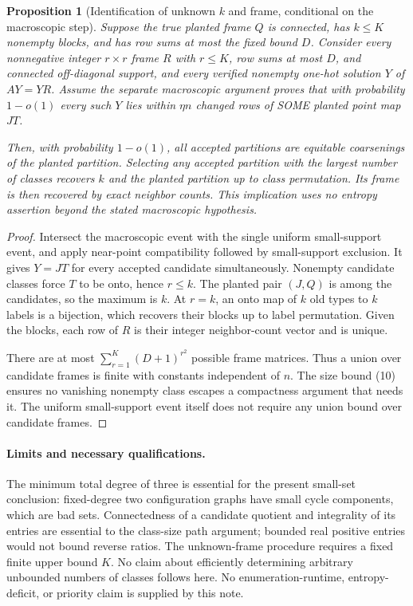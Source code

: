 \documentclass[11pt]{article}
\newtheorem{proposition}{Proposition}
\begin{document}
\begin{proposition}[Identification of unknown $k$ and frame, conditional
on the macroscopic step]
Suppose the true planted frame $Q$ is connected, has $k\leq K$ nonempty
blocks, and has row sums at most the fixed bound $D$. Consider every
nonnegative integer $r\times r$ frame $R$ with $r\leq K$, row sums at
most $D$, and connected off-diagonal support, and every verified nonempty
one-hot solution $Y$ of $AY=YR$. Assume the separate macroscopic argument
proves that with probability $1-o(1)$ every such $Y$ lies within
$\eta n$ changed rows of SOME planted point map $JT$.

Then, with probability $1-o(1)$, all accepted partitions are equitable
coarsenings of the planted partition. Selecting any accepted partition
with the largest number of classes recovers $k$ and the planted partition
up to class permutation. Its frame is then recovered by exact neighbor
counts. This implication uses no entropy assertion beyond the stated
macroscopic hypothesis.
\end{proposition}
\begin{proof}
Intersect the macroscopic event with the single uniform small-support
event, and apply near-point compatibility followed by small-support
exclusion. It gives $Y=JT$ for every accepted candidate simultaneously.
Nonempty candidate classes force $T$ to be onto, hence $r\leq k$.
The planted pair $(J,Q)$ is among the candidates, so the maximum is $k$.
At $r=k$, an onto map of $k$ old types to $k$ labels is a bijection,
which recovers their blocks up to label permutation. Given the blocks,
each row of $R$ is their integer neighbor-count vector and is unique.

There are at most $\sum_{r=1}^K(D+1)^{r^2}$ possible frame matrices.
Thus a union over candidate frames is finite with constants independent
of $n$. The size bound (10) ensures no vanishing nonempty class escapes
a compactness argument that needs it. The uniform small-support event
itself does not require any union bound over candidate frames.
\end{proof}

\paragraph{Limits and necessary qualifications.}
The minimum total degree of three is essential for the present small-set
conclusion: fixed-degree two configuration graphs have small cycle
components, which are bad sets. Connectedness of a candidate quotient
and integrality of its entries are essential to the class-size path
argument; bounded real positive entries would not bound reverse ratios.
The unknown-frame procedure requires a fixed finite upper bound $K$.
No claim about efficiently determining arbitrary unbounded numbers of
classes follows here. No enumeration-runtime, entropy-deficit, or priority
claim is supplied by this note.
\end{document}
